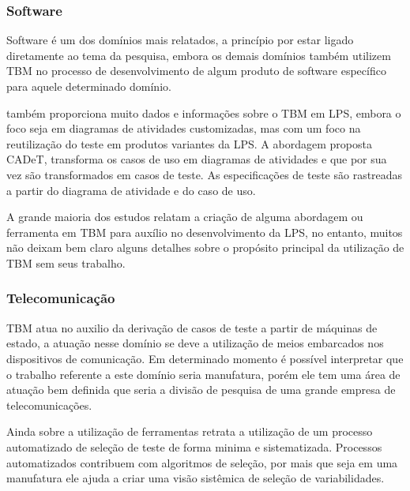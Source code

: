 \subsubsection{Software}

Software é um dos domínios mais relatados, a princípio por estar ligado diretamente ao tema da pesquisa, embora os demais domínios também utilizem TBM no processo de desenvolvimento de algum produto de software específico para aquele determinado domínio.

\cite{olimpiew2008model} também proporciona muito dados e informações sobre o TBM em LPS, embora o foco seja em diagramas de atividades customizadas, mas com um foco na reutilização do teste em produtos variantes da LPS. A abordagem proposta CADeT, transforma os casos de uso em diagramas de atividades e que por sua vez são transformados em casos de teste. As especificações de teste são rastreadas a partir do diagrama de atividade e do caso de uso.

A grande maioria dos estudos relatam a criação de alguma abordagem ou ferramenta em TBM para auxílio no desenvolvimento da LPS, no entanto, muitos não deixam bem claro alguns detalhes sobre o propósito principal da utilização de TBM sem seus trabalho. 

\subsubsection{Telecomunicação}
TBM atua no auxilio da derivação de casos de teste a partir de máquinas de estado, a atuação nesse domínio se deve a utilização de meios embarcados nos dispositivos de comunicação. Em determinado momento é possível interpretar que o trabalho referente a este domínio seria manufatura, porém ele tem uma área de atuação bem definida que seria a divisão de pesquisa de uma grande empresa de telecomunicações.

Ainda sobre a utilização de ferramentas \cite{wang2013automated} retrata a utilização de um processo automatizado de seleção de teste de forma minima e sistematizada. Processos automatizados contribuem com algoritmos de seleção, por mais que seja em uma manufatura ele ajuda a criar uma visão sistêmica de seleção de variabilidades. 

